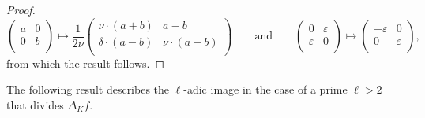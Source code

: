 \documentclass[11pt]{amsart}
\theoremstyle{definition}
\begin{document}
\begin{proof}
\[ \left(\begin{array}{cc} a & 0\\ 0 & b\\ \end{array}\right) 
\mapsto \frac{1}{2 \nu}
\left(\begin{array}{cc} \nu\cdot (a + b) & a - b \\ \delta\cdot (a - b) & \nu\cdot (a + b)\\ \end{array}\right) \qquad
\text{and} 
\qquad
\left( \begin{array}{cc} 0 & \varepsilon\\ \varepsilon & 0\\ \end{array}\right) 
\mapsto 
\left( \begin{array}{cc} -\varepsilon & 0 \\ 0 &\varepsilon \\ \end{array}\right), \]
from which the result follows.
\end{proof}

The following result describes the $\ell$-adic image in the case of a prime $\ell>2$ that divides $\Delta_K f$.
\end{document}
